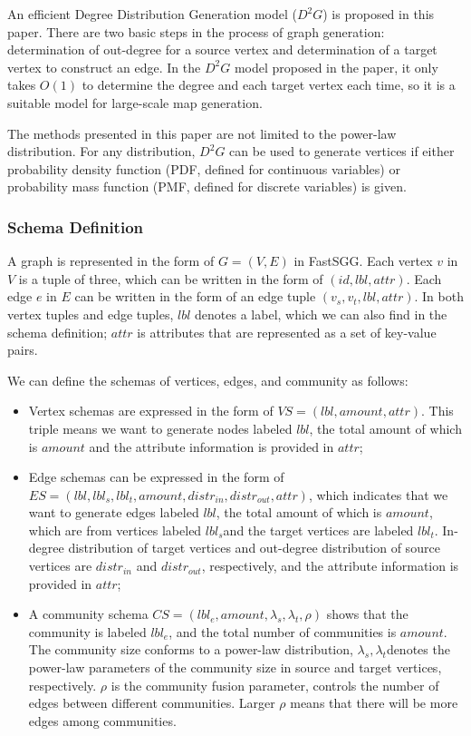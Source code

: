 \begin{survey}
An efficient Degree Distribution Generation model (\(D^2G\)) is proposed
in this paper. There are two basic steps in the process of graph
generation: determination of out-degree for a source vertex and
determination of a target vertex to construct an edge. In the \(D^2G\)
model proposed in the paper, it only takes \(O(1)\) to determine the
degree and each target vertex each time, so it is a suitable model for
large-scale map generation.

The methods presented in this paper are not limited to the power-law
distribution. For any distribution, \(D^2G\) can be used to generate
vertices if either probability density function (PDF, defined for
continuous variables) or probability mass function (PMF, defined for
discrete variables) is given.

\subsubsection{Schema Definition}

A graph is represented in the form of \(G=(V, E)\) in FastSGG. Each
vertex \(v\) in \(V\) is a tuple of three, which can be written in the
form of \((id, lbl, attr)\). Each edge \(e\) in \(E\) can be written in
the form of an edge tuple \((v_s,  v_t, lbl, attr)\). In both vertex
tuples and edge tuples, \(lbl\) denotes a label, which we can also find
in the schema definition; \(attr\) is attributes that are represented as
a set of key-value pairs.

We can define the schemas of vertices, edges, and community as follows:

\begin{itemize}
\item
  Vertex schemas are expressed in the form of
  \(VS = (lbl, amount, attr)\). This triple means we want to generate
  nodes labeled \(lbl\), the total amount of which is \(amount\) and the
  attribute information is provided in \(attr\);
\item
  Edge schemas can be expressed in the form of
  \(ES = (lbl, lbl_s, lbl_t, amount, distr_{in}, distr_{out}, attr)\),
  which indicates that we want to generate edges labeled \(lbl\), the
  total amount of which is \(amount\), which are from vertices labeled
  \(lbl_s\)and the target vertices are labeled \(lbl_t\). In-degree
  distribution of target vertices and out-degree distribution of source
  vertices are \(distr_{in}\) and \(distr_{out}\), respectively, and the
  attribute information is provided in \(attr\);
\item
  A community schema
  \(CS = (lbl_e, amount, \lambda_s, \lambda_t, \rho)\) shows that the
  community is labeled \(lbl_e\), and the total number of communities is
  \(amount\). The community size conforms to a power-law distribution,
  \(\lambda_s, \lambda_t\)denotes the power-law parameters of the
  community size in source and target vertices, respectively. \(\rho\)
  is the community fusion parameter, controls the number of edges
  between different communities. Larger \(\rho\) means that there will
  be more edges among communities.
\end{itemize}


\end{survey}
